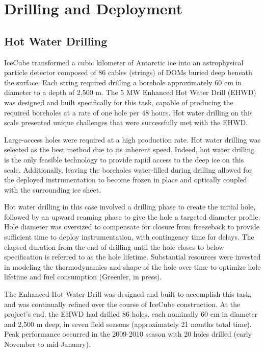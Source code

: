 
\section{Drilling and Deployment}

\subsection{\label{sec:hot_water_drilling}Hot Water Drilling}

IceCube transformed a cubic kilometer of Antarctic ice into an astrophysical particle detector composed of 86 cables (strings) of DOMs buried deep beneath the surface.  Each string required drilling a borehole approximately 60 cm in diameter to a depth of 2,500 m.  The 5 MW Enhanced Hot Water Drill (EHWD) was designed and built specifically for this task, capable of producing the required boreholes at a rate of one hole per 48 hours. Hot water drilling on this scale presented unique challenges that were successfully met with the EHWD.

Large-access holes were required at a high production rate.  Hot water drilling was selected as the best method due to its inherent speed.  Indeed, hot water drilling is the only feasible technology to provide rapid access to the deep ice on this scale.  Additionally, leaving the boreholes water-filled during drilling allowed for the deployed instrumentation to become frozen in place and optically coupled with the surrounding ice sheet.
 
Hot water drilling in this case involved a drilling phase to create the initial hole, followed by an upward reaming phase to give the hole a targeted diameter profile.  Hole diameter was oversized to compensate for closure from freezeback to provide sufficient time to deploy instrumentation, with contingency time for delays.  The elapsed duration from the end of drilling until the hole closes to below specification is referred to as the hole lifetime.  Substantial resources were invested in modeling the thermodynamics and shape of the hole over time to optimize hole lifetime and fuel consumption (Greenler, in press).

The Enhanced Hot Water Drill was designed and built to accomplish this task, and was continually refined over the course of IceCube construction.  At the project’s end, the EHWD had drilled 86 holes, each nominally 60 cm in diameter and 2,500 m deep, in seven field seasons (approximately 21 months total time).  Peak performance occurred in the 2009-2010 season with 20 holes drilled (early November to mid-January).  

